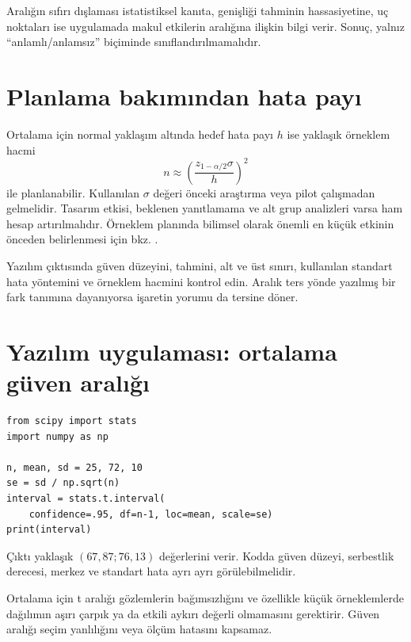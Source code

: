 Aralığın sıfırı dışlaması istatistiksel kanıta, genişliği tahminin
hassasiyetine, uç noktaları ise uygulamada makul etkilerin aralığına ilişkin
bilgi verir. Sonuç, yalnız ``anlamlı/anlamsız'' biçiminde sınıflandırılmamalıdır.

\section{Planlama bakımından hata payı}

Ortalama için normal yaklaşım altında hedef hata payı $h$ ise yaklaşık
örneklem hacmi
\[
n\approx\left(\frac{z_{1-\alpha/2}\sigma}{h}\right)^2
\]
ile planlanabilir. Kullanılan $\sigma$ değeri önceki araştırma veya pilot
çalışmadan gelmelidir. Tasarım etkisi, beklenen yanıtlamama ve alt grup
analizleri varsa ham hesap artırılmalıdır. Örneklem planında bilimsel olarak
önemli en küçük etkinin önceden belirlenmesi için bkz. \citet{lakens2022}.

\begin{outputguidebox}
Yazılım çıktısında güven düzeyini, tahmini, alt ve üst sınırı, kullanılan
standart hata yöntemini ve örneklem hacmini kontrol edin. Aralık ters yönde
yazılmış bir fark tanımına dayanıyorsa işaretin yorumu da tersine döner.
\end{outputguidebox}

\section{Yazılım uygulaması: ortalama güven aralığı}

\begin{softwarebox}
\begin{lstlisting}
from scipy import stats
import numpy as np

n, mean, sd = 25, 72, 10
se = sd / np.sqrt(n)
interval = stats.t.interval(
    confidence=.95, df=n-1, loc=mean, scale=se)
print(interval)
\end{lstlisting}
Çıktı yaklaşık $(67{,}87;76{,}13)$ değerlerini verir. Kodda güven düzeyi,
serbestlik derecesi, merkez ve standart hata ayrı ayrı görülebilmelidir.
\end{softwarebox}

\begin{assumptionbox}
Ortalama için t aralığı gözlemlerin bağımsızlığını ve özellikle küçük
örneklemlerde dağılımın aşırı çarpık ya da etkili aykırı değerli olmamasını
gerektirir. Güven aralığı seçim yanlılığını veya ölçüm hatasını kapsamaz.
\end{assumptionbox}

